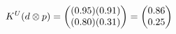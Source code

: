 \documentclass[preview]{standalone}
\begin{document}
\begin{align*}
\special{dvisvgm:raw <g id='unique000'>}K^U(d \otimes p) = \begin{pmatrix} (0.95)(0.91) \\ (0.80)(0.31) \end{pmatrix} = \begin{pmatrix} 0.86 \\ 0.25 \end{pmatrix}\special{dvisvgm:raw </g>}
\end{align*}
\end{document}
